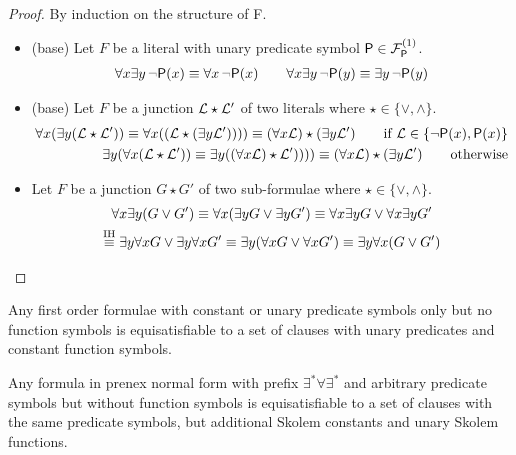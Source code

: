 \begin{proof}By induction on the structure of F. 
	\begin{itemize}
		\item(base) Let $F$ be a literal with unary predicate symbol $\mP\in\mcFPn[1]$.
		\begin{gather*}
		\forall x \exists y\,{\colG\lnot}\mP(x) \equiv \forall x\, {\colG\lnot}\mP(x) 
		\qquad 
		\forall x \exists y\, {\colG\lnot}\mP(y) \equiv \exists y\, {\colG\lnot}\mP(y)  
		\end{gather*}
		\item(base) Let $F$ be a junction $\mcL \star \mcL'$ of two literals 
		where $\star\in\{\lor,\land\}$.
		\begin{align*}
			\forall x(\exists y (\mcL\star\mcL'))
			\equiv \forall x((\mcL\star(\exists y\mcL')))    )
			\equiv (\forall x \mcL) \star (\exists y\mcL') 
			\tag*{if $\mcL\in\{\lnot\mP(x),\mP(x)\}$}
			\\
			\exists y(\forall x (\mcL\star\mcL'))
			\equiv \exists y((\forall x\mcL)\star \mcL')))    )
			\equiv (\forall x \mcL) \star (\exists y\mcL')
			\tag*{otherwise}
		\end{align*}
		\item Let $F$ be a junction $G\star G'$ of two sub-formulae
		where $\star\in\{\lor,\land\}$.
		\begin{gather*}
	\forall x\exists y (G\lor G') 
	\equiv \forall x (\exists y G \lor \exists y G')
	\equiv \forall x \exists y G \lor \forall x \exists y G'
\\
	\defEV[IH] \exists y\forall x  G \lor \exists y\forall x G'
	\equiv \exists y(\forall x  G \lor \forall x G')
	\equiv \exists y \forall x (G \lor G')
		\end{gather*}
		
	\end{itemize}
\end{proof}


\begin{lemma}
	Any first order formulae with constant or unary predicate symbols only but no function symbols 
	is equisatisfiable to a set of clauses with unary predicates and constant function symbols.
\end{lemma}

\begin{lemma}
	Any formula in prenex normal form with prefix $\exists^* \forall \exists^*$ 
	and arbitrary predicate symbols but without function symbols is equisatisfiable to 
	a set of clauses with the same predicate symbols, but additional Skolem constants and unary Skolem functions.
\end{lemma}



